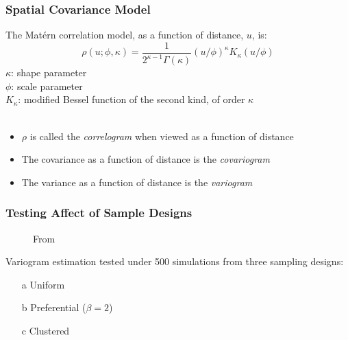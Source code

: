 \documentclass[xcolor=svgnames]{beamer}
\begin{document}
\begin{frame}
\frametitle{Spatial Covariance Model}

The Mat\'{e}rn correlation model, as a function of distance, $u$, is:
$$ \rho(u; \phi, \kappa) = \frac{1}{2^{\kappa - 1} \Gamma(\kappa)} (u/\phi)^\kappa K_\kappa(u/\phi) $$
$\kappa$: shape parameter \\
$\phi$: scale parameter \\
$K_\kappa$: modified Bessel function of the second kind, of order $\kappa$
~\\~\\
\begin{itemize}
\item $\rho$ is called the \emph{correlogram} when viewed as a function of distance
\item The covariance as a function of distance is the \emph{covariogram}
\item The variance as a function of distance is the \emph{variogram}
\end{itemize}
\end{frame}
\begin{frame}
\frametitle{Testing Affect of Sample Designs}
\begin{figure}
\centering
{}
\caption{From \citealt{diggle2010}}
\end{figure}
Variogram estimation tested under 500 simulations from three sampling designs:
\begin{enumerate}
\item[a] Uniform
\item[b] Preferential ($\beta=2$)
\item[c] Clustered
\end{enumerate}

\end{frame}
\end{document}
